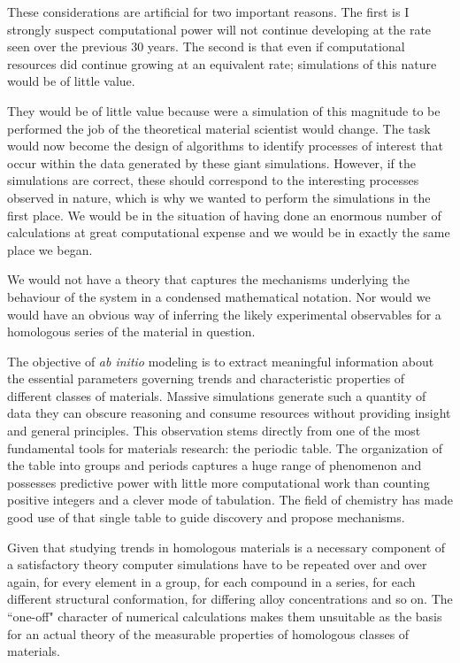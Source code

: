 These considerations are artificial for two important reasons. 
The first is I strongly suspect computational power will not continue 
developing at the rate seen over the previous 30 years. 
The second is that even if computational resources did continue growing 
at an equivalent rate; simulations of this nature would be of little value.

They would be of little value because were 
a simulation of this magnitude to be performed the
job of the theoretical material scientist would change. 
The task would now become the design of algorithms to identify 
processes of interest that occur within the data generated by 
these giant simulations. 
However, if the simulations are correct, these should correspond 
to the interesting processes observed in nature, which is why we wanted to
perform the simulations in the first place. We would be in the situation
of having done an enormous number of calculations at great computational
expense and we would be in exactly 
the same place we began. 

We would not have a theory that captures the mechanisms
underlying the behaviour of the system in a condensed mathematical notation. Nor 
would we would have an obvious way of inferring the likely experimental
observables for a homologous series of the material in question.

The objective of {\it ab initio} modeling is to extract meaningful information
about the essential parameters governing trends and characteristic properties 
of different classes of materials. Massive simulations generate such a quantity 
of data they can obscure reasoning and consume resources without providing insight 
and general principles. This observation stems directly from one of the
most fundamental tools for materials research: the periodic table. The 
organization of the table into groups and periods captures a huge range 
of phenomenon and possesses predictive power with little more computational
work than counting positive integers and a clever mode of tabulation.
The field of chemistry has made good use of that single table to guide
discovery and propose mechanisms.

Given that studying trends in homologous materials 
is a necessary component of a satisfactory
theory computer simulations have to be repeated 
over and over again, for every element in a group,
for each compound in a series, for each different structural conformation,
for differing alloy concentrations and so on. The ``one-off" character of 
numerical calculations makes them unsuitable as the basis for an actual 
theory of the measurable properties of homologous classes of materials.

